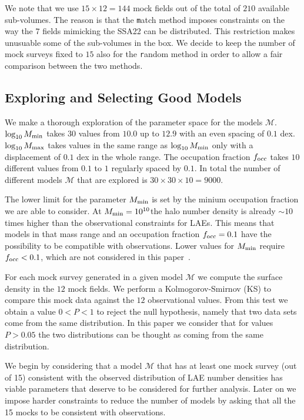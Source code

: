 \documentclass[usenatbib]{mn2e}
\newcommand{\documentname}{paper~}
\newcommand{\hMsun}{{\ifmmode{h^{-1}{\rm
        {M_{\odot}}}}\else{$h^{-1}{\rm{M_{\odot}}}$}\fi}}
\begin{document}
We note that we use $15\times 12=144$ mock fields out of the total of $210$
available sub-volumes. The reason is that the {\texttt match}
method imposes constraints on the way the $7$ fields mimicking the
SSA22 can be distributed. This restriction makes unusuable some of the
sub-volumes in the box. We decide to keep the number of mock surveys
fixed to $15$ also for the {\texttt random} method in order to allow a
fair comparison between the two methods.




\subsection{Exploring and Selecting Good Models}

We make a thorough exploration of the parameter space for the models
${\mathcal M}$. $\log_{10} M_{\rm min}$ takes $30$ values from $10.0$ up
to $12.9$ with an even spacing of $0.1$ dex. $\log_{10} M_{\rm max}$
takes values in the same range as $\log_{10}M_{\rm min}$ only with a
displacement of $0.1$ dex in the whole range. The occupation fraction
$f_{\rm occ}$ takes $10$ different values from $0.1$ to $1$ regularly
spaced by $0.1$. In total the number of different models ${\mathcal
  M}$ that are explored is $30 \times 30 \times 10 = 9000$. 


The lower limit for the parameter $M_{\rm min}$ is set by the minium
occupation fraction we are able to consider. At $M_{\rm
  min}=10^{10}$\hMsun the halo number density is already $\sim 10$
times higher than the observational constraints for LAEs. This means
that models in that mass range and an occupation fraction $f_{\rm
  occ}=0.1$ have the possibility to be compatible with observations. Lower
values for $M_{\rm min}$ require $f_{\rm occ}<0.1$, which are not
considered in this \documentname. 

For each mock survey generated in a given model ${\mathcal M}$ we
compute the surface density in the $12$ mock fields. We perform a
Kolmogorov-Smirnov (KS) to compare this mock data against the $12$
observational values. From this test we obtain a value $0<P<1$ to
reject the null hypothesis, namely that two data sets come from the
same distribution. In this paper we consider that for values $P>0.05$
the two distributions can be thought as coming from the same
distribution.

We begin by considering that  a model ${\mathcal M}$ that has at least
one mock survey (out of 15) consistent with the observed
distribution of LAE number densities has viable parameters that
deserve to be considered for further analysis. Later on we impose
harder constraints to reduce the number of models by asking that all
the 15 mocks to be consistent with observations.
\end{document}
